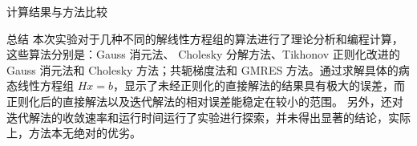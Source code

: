 \documentclass[a4paper]{article}
\begin{document}
\begin{multicols}{2}
\begin{section}{计算结果与方法比较}
\end{section}

\begin{section}{总结}
	本次实验对于几种不同的解线性方程组的算法进行了理论分析和编程计算，这些算法分别是：Gauss 消元法、 Cholesky 分解⽅法、Tikhonov 正则化改进的 Gauss 消元法和 Cholesky ⽅法；共轭梯度法和 GMRES ⽅法。通过求解具体的病态线性方程组 $Hx = b$，显示了未经正则化的直接解法的结果具有极大的误差，而正则化后的直接解法以及迭代解法的相对误差能稳定在较小的范围。
	另外，还对迭代解法的收敛速率和运行时间运行了实验进行探索，并未得出显著的结论，实际上，方法本无绝对的优劣。
\end{section}

\end{multicols}



%
%

\end{document}

